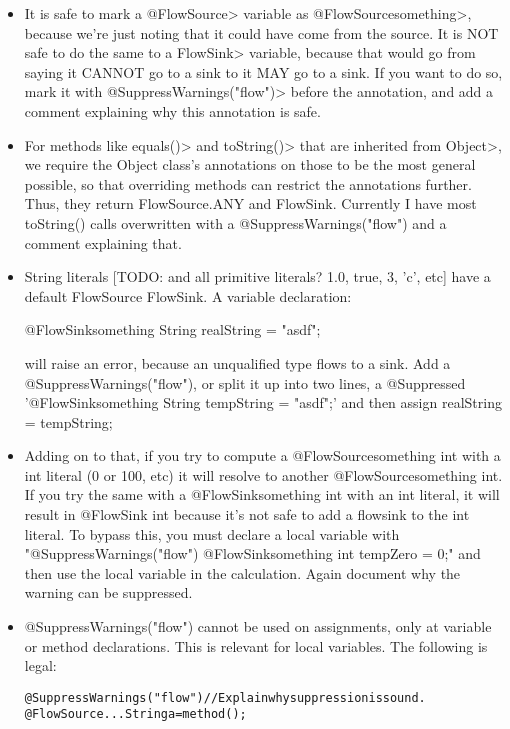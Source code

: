 \begin{itemize}
\item It is safe to mark a \<@FlowSource{}> variable as
 \<@FlowSource{something}>, because we're just noting that it could have
 come from the source. It is NOT safe to do the same to a \<FlowSink{}>
 variable, because that would go from saying it CANNOT go to a sink to
 it MAY go to a sink. If you want to do so, mark it with
 \<@SuppressWarnings("flow")> before the annotation, and add a comment
 explaining why this annotation is safe.

\item For methods like \<equals()> and \<toString()> that are inherited from
 \<Object>, we require the Object class's annotations on those to be the
 most general possible, so that overriding methods can restrict the
 annotations further. Thus, they return FlowSource.ANY and
 FlowSink{}. Currently I have most toString() calls overwritten with a
 @SuppressWarnings("flow") and a comment explaining that. 

\item String literals [TODO: and all primitive literals? 1.0, true, 3, 'c',
 etc] have a default FlowSource{} FlowSink{}. A variable declaration:

 @FlowSink{something} String realString = "asdf";

 will raise an error, because an unqualified type flows to a sink.
 Add a @SuppressWarnings("flow"), or split it up into two
 lines, a @Suppressed '@FlowSink{something} String tempString =
 "asdf";' and then assign realString = tempString;

\item Adding on to that, if you try to compute a @FlowSource{something} int
 with a int literal (0 or 100, etc) it will resolve to another
 @FlowSource{something} int. If you try the same with a
 @FlowSink{something} int with an int literal, it will result in
 @FlowSink{} int because it's not safe to add a flowsink to the int
 literal. To bypass this, you must declare a local variable with
 "@SuppressWarnings("flow") @FlowSink{something} int tempZero = 0;"
 and then use the local variable in the calculation.
 Again document why the warning can be suppressed.

\item @SuppressWarnings("flow") cannot be used on assignments, only at
 variable or method declarations. This is relevant for local
 variables.
 The following is legal:

\begin{alltt}
	@SuppressWarnings("flow") // Explain why suppression is sound.
	@FlowSource... String a = method();
\end{alltt}


\end{itemize}
